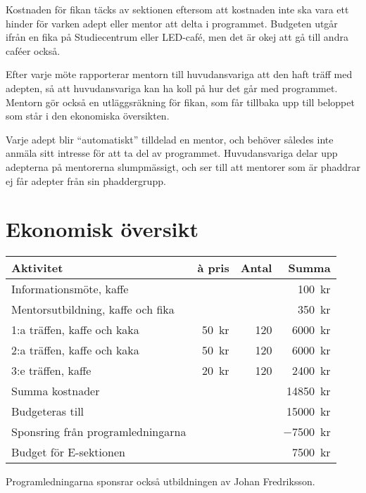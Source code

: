 \documentclass[10pt]{article}
\begin{document}
    Kostnaden för fikan täcks av sektionen eftersom att kostnaden inte ska vara ett hinder för varken adept eller mentor att delta i programmet.
    Budgeten utgår ifrån en fika på Studiecentrum eller LED-café, men det är okej att gå till andra caféer också.

    Efter varje möte rapporterar mentorn till huvudansvariga att den haft träff med adepten, så att huvudansvariga kan ha koll på hur det går med programmet.
    Mentorn gör också en utläggsräkning för fikan, som får tillbaka upp till beloppet som står i den ekonomiska översikten.

    Varje adept blir ``automatiskt'' tilldelad en mentor, och behöver således inte anmäla sitt intresse för att ta del av programmet.
    Huvudansvariga delar upp adepterna på mentorerna slumpmässigt, och ser till att mentorer som är phaddrar ej får adepter från sin phaddergrupp.

    \newpage

    \section{Ekonomisk översikt}
    \begin{tabularx}{\textwidth}{Xrrr}
        \textbf{Aktivitet} & \textbf{\`a pris} & \textbf{Antal} & \textbf{Summa} \\
        \hline
        Informationsmöte, kaffe & & & \SI{100}{kr} \\
        Mentorsutbildning, kaffe och fika & & & \SI{350}{kr} \\
        1:a träffen, kaffe och kaka & \SI{50}{kr} & 120 & \SI{6000}{kr} \\
        2:a träffen, kaffe och kaka & \SI{50}{kr} & 120 & \SI{6000}{kr} \\
        3:e träffen, kaffe & \SI{20}{kr} & 120 & \SI{2400}{kr} \\
        \hline
        Summa kostnader & & & \SI{14850}{kr}\\
        Budgeteras till & & & \SI{15000}{kr}\\
        Sponsring från programledningarna & & & \SI{-7500}{kr} \\
        \hline
        Budget för E-sektionen & & & \SI{7500}{kr} \\
    \end{tabularx}

    Programledningarna sponsrar också utbildningen av Johan Fredriksson.

    \vspace*{\baselineskip}
\end{document}
